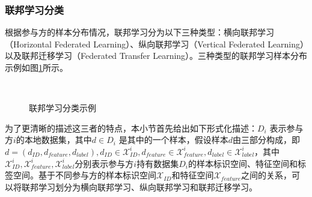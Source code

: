 \subsubsection{联邦学习分类}
根据参与方的样本分布情况，联邦学习分为以下三种类型：横向联邦学习（Horizontal Federated Learning）、纵向联邦学习（Vertical Federated Learning）以及联邦迁移学习（Federated Transfer Learning）\cite{zhu2021fedsurvey}。三种类型的联邦学习样本分布示例如图\ref{fldemo}所示。
\begin{figure}
	\centering%
	 \\
	\caption{联邦学习分类示例}
	\label{fldemo}
\end{figure}

为了更清晰的描述这三者的特点，本小节首先给出如下形式化描述：${D}_i$ 表示参与方$i$的本地数据集，其中$d \in {D}_i$ 是其中的一个样本，假设样本$d$由三部分构成，即$d = (d_{ID}, d_{feature}, d_{label}), d_{ID} \in \mathcal{X}^i_{ID}, d_{feature} \in \mathcal{X}^i_{feature}, d_{label} \in \mathcal{X}^i_{label}$，其中$\mathcal{X}^i_{ID}, \mathcal{X}^i_{feature}, \mathcal{X}^i_{label}$分别表示参与方$i$持有数据集${D}_i$的样本标识空间、特征空间和标签空间。基于不同参与方的样本标识空间$\mathcal{X}_{ID}$和特征空间$\mathcal{X}_{feature}$之间的关系，可以将联邦学习划分为横向联邦学习、纵向联邦学习和联邦迁移学习。

%
%

